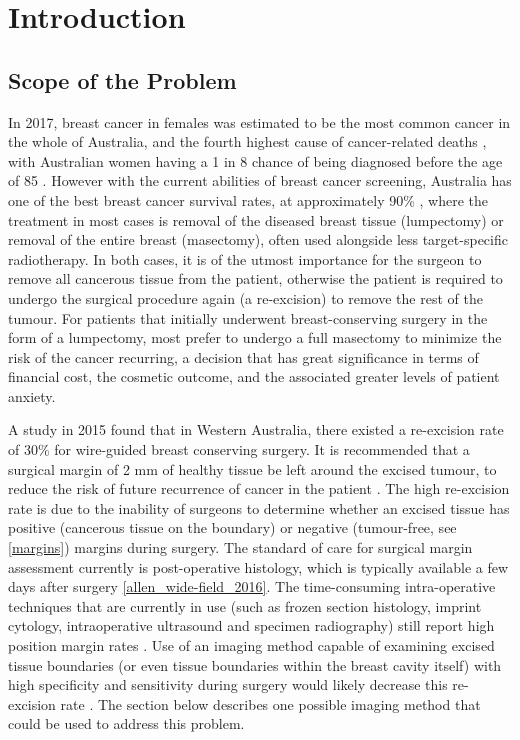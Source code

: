 \chapter{Introduction}

\section{Scope of the Problem}\label{problem}
In 2017, breast cancer in females was estimated to be the most common cancer in the whole of Australia, and the fourth highest cause of cancer-related deaths \cite{australian_institute_of_health_and_welfare_cancer_2017}, with Australian women having a 1 in 8 chance of being diagnosed before the age of 85 \cite{australian_institute_of_health_and_welfare_breast_2012}. However with the current abilities of breast cancer screening, Australia has one of the best breast cancer survival rates, at approximately 90\% \cite{australian_institute_of_health_and_welfare_breast_2012}, where the treatment in most cases is removal of the diseased breast tissue (lumpectomy) or removal of the entire breast (masectomy), often used alongside less target-specific radiotherapy. In both cases, it is of the utmost importance for the surgeon to remove all cancerous tissue from the patient, otherwise the patient is required to undergo the surgical procedure again (a re-excision) to remove the rest of the tumour. For patients that initially underwent breast-conserving surgery in the form of a lumpectomy, most prefer to undergo a full masectomy to minimize the risk of the cancer recurring, a decision that has great significance in terms of financial cost, the cosmetic outcome, and the associated greater levels of patient anxiety. 

A study in 2015 \cite{ballal_predictors_2015} found that in Western Australia, there existed a re-excision rate of 30\% for wire-guided breast conserving surgery. It is recommended that a surgical margin of 2 mm of healthy tissue be left around the excised tumour, to reduce the risk of future recurrence of cancer in the patient \cite{behm_surgical_2013}. The high re-excision rate is due to the inability of surgeons to determine whether an excised tissue has positive (cancerous tissue on the boundary) or negative (tumour-free, see \autoref{margins}) margins during surgery. The standard of care for surgical margin assessment currently is post-operative histology, which is typically available a few days after surgery \ref{allen_wide-field_2016}. The time-consuming intra-operative techniques that are currently in use (such as frozen section histology, imprint cytology, intraoperative ultrasound and specimen radiography) still report high position margin rates \cite{cabioglu_role_2007}. Use of an imaging method capable of examining excised tissue boundaries (or even tissue boundaries within the breast cavity itself) with high specificity and sensitivity during surgery would likely decrease this re-excision rate \cite{ballal_predictors_2015}. The section below describes one possible imaging method that could be used to address this problem. 

